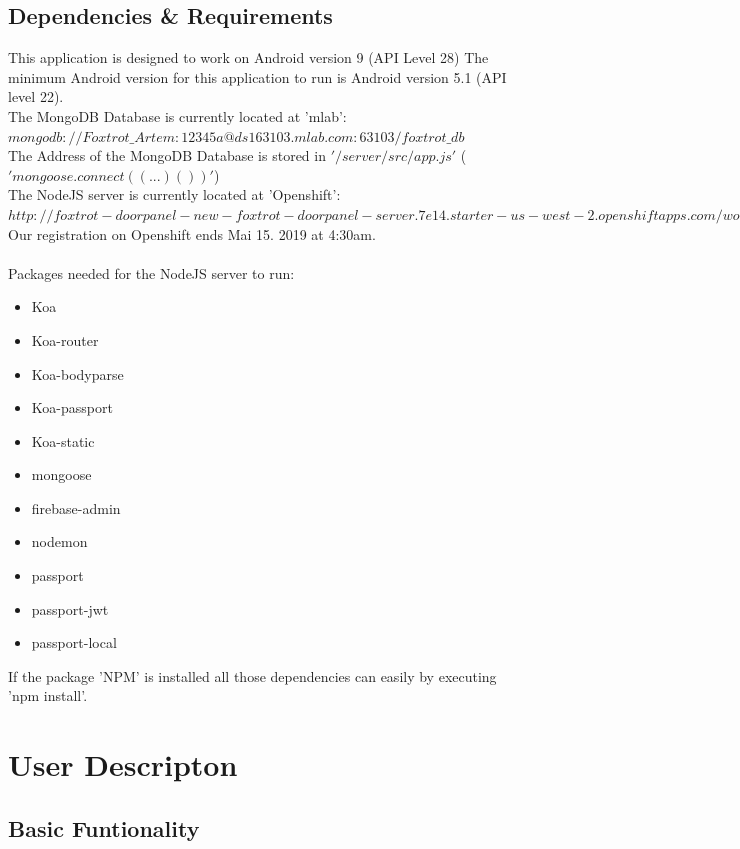 \documentclass[article,colorback,accentcolor=tud4c, 11pt]{tudreport}
\begin{document}
\subsection{Dependencies \& Requirements}

This application is designed to work on Android version 9 (API Level 28)
The minimum Android version for this application to run is Android version 5.1 (API level 22). \\

The MongoDB Database is currently located at 'mlab':\\
$mongodb://Foxtrot\_Artem:12345a@ds163103.mlab.com:63103/foxtrot\_db$\\
The Address of the MongoDB Database is stored in $'/server/src/app.js'$ ($'mongoose.connect((...)())'$)\\

The NodeJS server is currently located at 'Openshift': $http://foxtrot-doorpanel-new-foxtrot-doorpanel-server.7e14.starter-us-west-2.openshiftapps.com/workers$\\ 
Our registration on Openshift ends Mai 15. 2019 at 4:30am.\\ \\
Packages needed for the NodeJS server to run:
\begin{itemize}
	\item Koa
	\item Koa-router
	\item Koa-bodyparse
	\item Koa-passport
	\item Koa-static
	\item mongoose
	\item firebase-admin
	\item nodemon
	\item passport
	\item passport-jwt
	\item passport-local
\end{itemize}

If the package 'NPM' is installed all those dependencies can easily by executing 'npm install'.\\

	
\section{User Descripton}

	
\subsection{Basic Funtionality}
\end{document}
